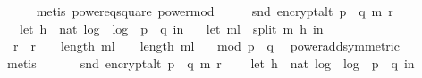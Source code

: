 \begin{isabellebody}
\ \ \ \ \isamarkupfalse%
\ {\isacharparenleft}{\kern0pt}metis\ power{}{\isacharunderscore}{\kern0pt}eq{\isacharunderscore}{\kern0pt}square\ power{\isacharunderscore}{\kern0pt}mod{\isacharparenright}{\kern0pt}\isanewline
\isanewline
\ \ \isamarkupfalse%
\ \isamarkupfalse%
\ {\isachardoublequoteopen}snd\ {\isacharparenleft}{\kern0pt}encrypt{\isacharunderscore}{\kern0pt}alt\ {\isacharparenleft}{\kern0pt}p\ {\isacharasterisk}{\kern0pt}\ q{\isacharparenright}{\kern0pt}\ m\ r{\isacharparenright}{\kern0pt}\ \isanewline
\ \ {\isacharequal}{\kern0pt}\ {\isacharparenleft}{\kern0pt}let\ h\ {\isacharequal}{\kern0pt}\ nat\ {\isasymlfloor}log\ {}\ {\isacharparenleft}{\kern0pt}log\ {}\ {\isacharparenleft}{\kern0pt}p\ {\isacharasterisk}{\kern0pt}\ q{\isacharparenright}{\kern0pt}{\isacharparenright}{\kern0pt}{\isasymrfloor}\ in\ \isanewline
\ \ let\ m{\isacharunderscore}{\kern0pt}l\ {\isacharequal}{\kern0pt}\ split\ m\ h\ in\ \ \isanewline
\ \ {\isacharparenleft}{\kern0pt}{\isacharparenleft}{\kern0pt}r\ {\isacharasterisk}{\kern0pt}\ r{\isacharparenright}{\kern0pt}\ {\isacharcircum}{\kern0pt}\ {\isacharparenleft}{\kern0pt}{}\ {\isacharcircum}{\kern0pt}\ {\isacharparenleft}{\kern0pt}length\ m{\isacharunderscore}{\kern0pt}l{\isacharparenright}{\kern0pt}\ {\isacharplus}{\kern0pt}\ {}\ {\isacharcircum}{\kern0pt}\ {\isacharparenleft}{\kern0pt}length\ m{\isacharunderscore}{\kern0pt}l{\isacharparenright}{\kern0pt}{\isacharparenright}{\kern0pt}{\isacharparenright}{\kern0pt}{\isacharparenright}{\kern0pt}\isanewline
\ \ \ mod\ {\isacharparenleft}{\kern0pt}p\ {\isacharasterisk}{\kern0pt}\ q{\isacharparenright}{\kern0pt}{\isachardoublequoteclose}\ \isamarkupfalse%
\ power{\isacharunderscore}{\kern0pt}add{\isacharbrackleft}{\kern0pt}symmetric{\isacharbrackright}{\kern0pt}\isanewline
\ \ \ \ \isamarkupfalse%
\ metis\isanewline
\isanewline
\ \ \ \isamarkupfalse%
\ \isamarkupfalse%
\ {\isachardoublequoteopen}snd\ {\isacharparenleft}{\kern0pt}encrypt{\isacharunderscore}{\kern0pt}alt\ {\isacharparenleft}{\kern0pt}p\ {\isacharasterisk}{\kern0pt}\ q{\isacharparenright}{\kern0pt}\ m\ r{\isacharparenright}{\kern0pt}\ \isanewline
\ \ {\isacharequal}{\kern0pt}\ {\isacharparenleft}{\kern0pt}let\ h\ {\isacharequal}{\kern0pt}\ nat\ {\isasymlfloor}log\ {}\ {\isacharparenleft}{\kern0pt}log\ {}\ {\isacharparenleft}{\kern0pt}p\ {\isacharasterisk}{\kern0pt}\ q{\isacharparenright}{\kern0pt}{\isacharparenright}{\kern0pt}{\isasymrfloor}\ in\ \isanewline

\end{isabellebody}
